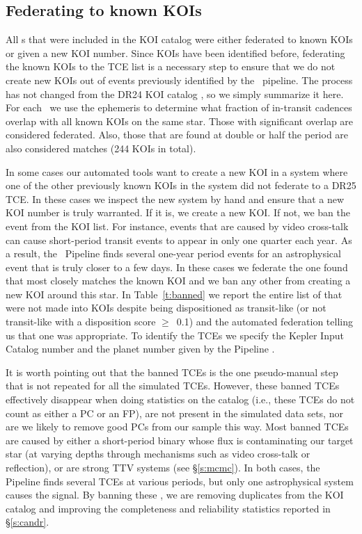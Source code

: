 \subsection{Federating to known KOIs}
\label{s:federation}
All \opstce s that were included in the KOI catalog were either federated to known KOIs or given a new KOI number. Since KOIs have been identified before, federating the known KOIs to the TCE list is a necessary step to ensure that we do not create new KOIs out of events previously identified by the \Kepler\ pipeline.  The process has not changed from the DR24 KOI catalog \citep[see \S4.2 of][]{Coughlin2016}, so we simply summarize it here.  For each \opstce\ we use the ephemeris to determine what fraction of in-transit cadences overlap with all known KOIs on the same star.  Those with significant overlap are considered federated.  Also, those that are found at double or half the period are also considered matches (244 KOIs in total).  

In some cases our automated tools want to create a new KOI in a system where one of the other previously known KOIs in the system did not federate to a DR25 TCE.  In these cases we inspect the new system by hand and ensure that a new KOI number is truly warranted. If it is, we create a new KOI. If not, we ban the event from the KOI list.  For instance, events that are caused by video cross-talk \citep{KIH} can cause short-period transit events to appear in only one quarter each year. As a result, the \Kepler\ Pipeline finds several one-year period events for an astrophysical event that is truly closer to a few days.  In these cases we federate the one found that most closely matches the known KOI and we ban any other  from creating a new KOI around this star. In Table~\ref{t:banned} we report the entire list of  that were not made into KOIs despite being dispositioned as transit-like (or not transit-like with a disposition score $\ge$~0.1) and the automated federation telling us that one was appropriate. To identify the TCEs we specify the Kepler Input Catalog number and the planet number given by the \Kepler{} Pipeline \citep{Twicken2016}.



It is worth pointing out that the banned TCEs is the one pseudo-manual step that is not repeated for all the simulated TCEs.  However, these banned TCEs effectively disappear when doing statistics on the catalog (i.e., these TCEs do not count as either a PC or an FP), are not present in the simulated data sets, nor are we likely to remove good PCs from our sample this way. Most banned TCEs are caused by either a short-period binary whose flux is contaminating our target star (at varying depths through mechanisms such as video cross-talk or reflection), or are strong TTV systems (see \S\ref{s:mcmc}). In both cases, the Pipeline finds several TCEs at various periods, but only one astrophysical system causes the signal.  By banning these \opstces, we are removing duplicates from the KOI catalog and improving the completeness and reliability statistics reported in \S\ref{s:candr}.
